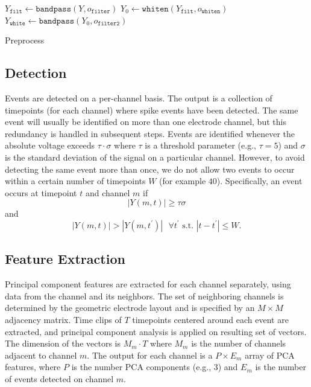 \documentclass[hidelinks,10pt]{article}
\begin{document}
\begin{algorithm}
\DontPrintSemicolon %

$Y_\texttt{filt}\gets\texttt{bandpass}(Y,o_\texttt{filter})$\;
$Y_0\gets\texttt{whiten}(Y_\texttt{filt},o_\texttt{whiten})$\;
$Y_\texttt{white}\gets\texttt{bandpass}(Y_0,o_\texttt{filter2})$\;

\caption{{\sc Preprocess}}
\label{algo:preprocess}
\end{algorithm}

\subsection {Detection}

Events are detected on a per-channel basis. The output is a collection of timepoints (for each channel) where spike events have been detected. The same event will usually be identified on more than one electrode channel, but this redundancy is handled in subsequent steps. Events are identified whenever the absolute voltage exceeds $\tau\cdot \sigma$ where $\tau$ is a threshold parameter (e.g., $\tau=5$) and $\sigma$ is the standard deviation of the signal on a particular channel. However, to avoid detecting the same event more than once, we do not allow two events to occur within a certain number of timepoints $W$ (for example $40$). Specifically, an event occurs at timepoint $t$ and channel $m$ if $$|Y(m,t)|\geq \tau\sigma$$ and 
$$|Y(m,t)|>|Y(m,t^\prime)|\text{ }\forall t^\prime \text{ s.t. } |t-t^\prime|\leq W.$$

\subsection {Feature Extraction}

Principal component features are extracted for each channel separately, using data from the channel and its neighbors. The set of neighboring channels is determined by the geometric electrode layout and is specified by an $M\times M$ adjacency matrix. Time clips of $T$ timepoints centered around each event are extracted, and principal component analysis is applied on resulting set of vectors. The dimension of the vectors is $M_m\cdot T$ where $M_m$ is the number of channels adjacent to channel $m$. The output for each channel is a $P\times E_m$ array of PCA features, where $P$ is the number PCA components (e.g., 3) and $E_m$ is the number of events detected on channel $m$.
\end{document}
